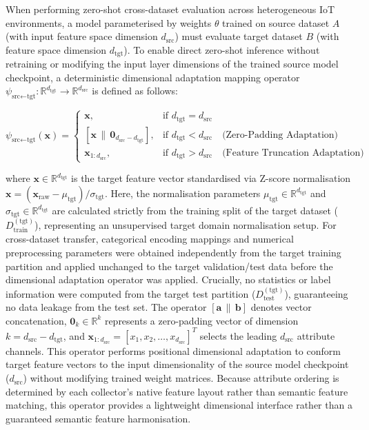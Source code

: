 \documentclass[a4paper,fleqn]{cas-sc}
\begin{document}
When performing zero-shot cross-dataset evaluation across heterogeneous IoT environments, a model parameterised by weights $\theta$ trained on source dataset $A$ (with input feature space dimension $d_{\text{src}}$) must evaluate target dataset $B$ (with feature space dimension $d_{\text{tgt}}$). To enable direct zero-shot inference without retraining or modifying the input layer dimensions of the trained source model checkpoint, a deterministic dimensional adaptation mapping operator $\psi_{\text{src} \leftarrow \text{tgt}}: \mathbb{R}^{d_{\text{tgt}}} \rightarrow \mathbb{R}^{d_{\text{src}}}$ is defined as follows:

\begin{equation}
\psi_{\text{src} \leftarrow \text{tgt}}(\mathbf{x}) = 
\begin{cases}
\mathbf{x}, & \text{if } d_{\text{tgt}} = d_{\text{src}} \\[1.5ex]
\left[ \mathbf{x} \,\|\, \mathbf{0}_{d_{\text{src}} - d_{\text{tgt}}} \right], & \text{if } d_{\text{tgt}} < d_{\text{src}} \quad \text{(Zero-Padding Adaptation)} \\[1.5ex]
\mathbf{x}_{1:d_{\text{src}}}, & \text{if } d_{\text{tgt}} > d_{\text{src}} \quad \text{(Feature Truncation Adaptation)}
\end{cases}
\label{eq:cross_dataset_alignment}
\end{equation}

where $\mathbf{x} \in \mathbb{R}^{d_{\text{tgt}}}$ is the target feature vector standardised via Z-score normalisation $\mathbf{x} = (\mathbf{x}_{\text{raw}} - \mu_{\text{tgt}}) / \sigma_{\text{tgt}}$. Here, the normalisation parameters $\mu_{\text{tgt}} \in \mathbb{R}^{d_{\text{tgt}}}$ and $\sigma_{\text{tgt}} \in \mathbb{R}^{d_{\text{tgt}}}$ are calculated strictly from the training split of the target dataset ($D_{\text{train}}^{(\text{tgt})}$), representing an unsupervised target domain normalisation setup. For cross-dataset transfer, categorical encoding mappings and numerical preprocessing parameters were obtained independently from the target training partition and applied unchanged to the target validation/test data before the dimensional adaptation operator was applied. Crucially, no statistics or label information were computed from the target test partition ($D_{\text{test}}^{(\text{tgt})}$), guaranteeing no data leakage from the test set. The operator $[\mathbf{a} \,\|\, \mathbf{b}]$ denotes vector concatenation, $\mathbf{0}_{k} \in \mathbb{R}^k$ represents a zero-padding vector of dimension $k = d_{\text{src}} - d_{\text{tgt}}$, and $\mathbf{x}_{1:d_{\text{src}}} = [x_1, x_2, \dots, x_{d_{\text{src}}}]^T$ selects the leading $d_{\text{src}}$ attribute channels. This operator performs positional dimensional adaptation to conform target feature vectors to the input dimensionality of the source model checkpoint ($d_{\text{src}}$) without modifying trained weight matrices. Because attribute ordering is determined by each collector's native feature layout rather than semantic feature matching, this operator provides a lightweight dimensional interface rather than a guaranteed semantic feature harmonisation.
\end{document}
